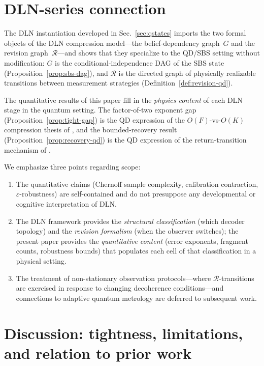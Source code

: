 \documentclass[11pt]{article}
\newcommand{\1}{\mathbf{1}}
\theoremstyle{definition}
\theoremstyle{plain}
\begin{document}
\section{DLN-series connection}
\label{sec:dln-brief}

The DLN instantiation developed in Sec.~\ref{sec:qstates} imports the
two formal objects of the DLN compression model---the belief-dependency
graph~$G$ and the revision graph~$\mathcal{R}$---and shows that they
specialize to the QD/SBS setting without modification:
$G$ is the conditional-independence DAG of the SBS state
(Proposition~\ref{prop:sbs-dag}), and
$\mathcal{R}$ is the directed graph of physically realizable transitions
between measurement strategies
(Definition~\ref{def:revision-qd}).

The quantitative results of this paper fill in the \emph{physics content}
of each DLN stage in the quantum setting.
The factor-of-two exponent gap
(Proposition~\ref{prop:tight-gap}) is the QD expression of the
$O(F)$-vs-$O(K)$ compression thesis of
\citep[Proposition~1(i)]{WuDLNCompression2026preprint},
and the bounded-recovery result
(Proposition~\ref{prop:recovery-qd}) is the QD expression of the
return-transition mechanism of
\citep[Proposition~1(iii)]{WuDLNCompression2026preprint}.

We emphasize three points regarding scope:
\begin{enumerate}[leftmargin=2em]
\item The quantitative claims (Chernoff sample complexity, calibration
  contraction, $\varepsilon$-robustness) are self-contained and do not
  presuppose any developmental or cognitive interpretation of DLN.
\item The DLN framework provides the \emph{structural classification}
  (which decoder topology) and the \emph{revision formalism} (when the
  observer switches); the present paper provides the \emph{quantitative
  content} (error exponents, fragment counts, robustness bounds) that
  populates each cell of that classification in a physical setting.
\item The treatment of non-stationary observation protocols---where
  $\mathcal{R}$-transitions are exercised in response to changing
  decoherence conditions---and connections to adaptive quantum
  metrology are deferred to subsequent work.
\end{enumerate}

\section{Discussion: tightness, limitations, and relation to prior work}
\end{document}
